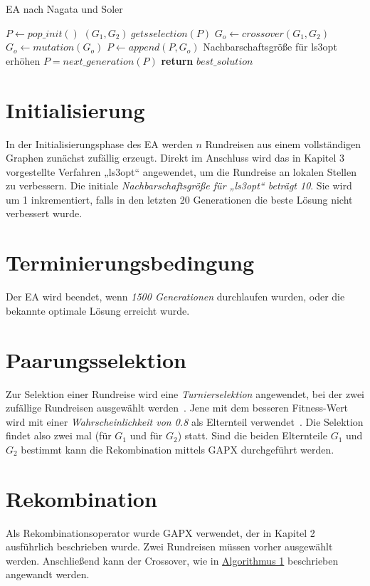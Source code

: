 \begin{algorithm}
\caption{EA nach Nagata und Soler }\label{alg:ea}
\begin{algorithmic}[1]
    \State $P \gets pop\_init()$
      \State $(G_1, G_2) \ gets selection(P)$
      \State $G_o \gets crossover(G_1, G_2)$
        \State $G_o \gets mutation(G_o)$
      \EndIf
      \State $P \gets append(P, G_o)$
        \State Nachbarschaftsgröße für ls3opt erhöhen
      \EndIf
      \State $P = next\_generation(P)$
    \EndWhile
    \State \textbf{return} $best\_solution$
  \EndProcedure
\end{algorithmic}
\end{algorithm}
\section{Initialisierung}
In der Initialisierungsphase des EA werden $n$ Rundreisen aus einem
vollständigen Graphen zunächst zufällig erzeugt. Direkt im Anschluss
wird das in Kapitel 3 vorgestellte Verfahren „ls3opt“ angewendet, um die
Rundreise an lokalen Stellen zu verbessern. Die initiale
\textit{Nachbarschaftsgröße für „ls3opt“ beträgt 10}. Sie wird um 1
inkrementiert, falls in den letzten 20 Generationen die beste Lösung
nicht verbessert wurde.
\section{Terminierungsbedingung}
Der EA wird beendet, wenn \textit{1500 Generationen} durchlaufen wurden, oder
die bekannte optimale Lösung erreicht wurde. 
\section{Paarungsselektion}
Zur Selektion einer Rundreise wird eine \textit{Turnierselektion} angewendet, 
bei der zwei zufällige Rundreisen ausgewählt werden~\cite{weicker}. Jene mit dem
besseren Fitness-Wert wird mit einer \textit{Wahrscheinlichkeit von 0.8} als 
Elternteil verwendet~\cite{gapx}. Die Selektion findet also zwei mal 
(für $G_1$ und für $G_2$) statt. Sind die beiden Elternteile $G_1$ und
$G_2$ bestimmt kann die Rekombination mittels GAPX durchgeführt werden.
\section{Rekombination}
Als Rekombinationsoperator wurde GAPX verwendet, der in Kapitel 2
ausführlich beschrieben wurde. Zwei Rundreisen müssen vorher ausgewählt
werden. Anschließend kann der Crossover, wie in
\hyperref[alg:crossover_ea]{Algorithmus 1}
beschrieben angewandt werden.
